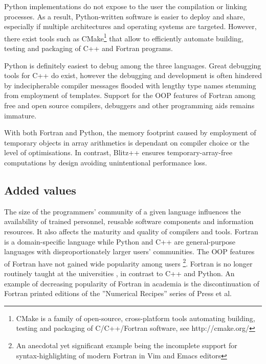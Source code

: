 \documentclass[final,5p,times,twocolumn]{elsarticle}
\newcommand{\url}[1]{{#1}}
\begin{document}
  Python implementations do not expose to the user the compilation or linking processes. 
  As a result, Python-written software is easier to deploy and share, especially 
    if multiple architectures and operating systems are targeted.
  However, there exist tools such as CMake\footnote{CMake is a family of open-source, cross-platform
    tools automating building, testing and packaging of C/C++/Fortran software,
    see \url{http://cmake.org/}}
    that allow to efficiently automate 
    building, testing and packaging of C++ and Fortran programs.

  Python is definitely easiest to debug among the three languages.
  Great debugging tools for C++ do exist, however the debugging and development is 
    often hindered by indecipherable compiler messages
    flooded with lengthy type names stemming from employment of templates.
  Support for the OOP features of Fortran among free and open source compilers, 
    debuggers and other programming aids remains immature.
    
  With both Fortran and Python, the memory footprint caused by employment
    of temporary objects in array arithmetics is dependant on compiler choice or
    the level of optimisations.
  In contrast, Blitz++ ensures temporary-array-free computations by design
    \citep{Veldhuizen_et_al_1997} avoiding unintentional performance loss.

  \subsection{Added values}

  The size of the programmers' community of a given language 
    influences the availability of trained personnel, 
    reusable software components and information resources.
  It also affects the maturity and quality of compilers and tools. 
  Fortran is a domain-specific language while Python and C++ are general-purpose languages
    with disproportionately larger users' communities.
  The OOP features of Fortran have not gained
    wide popularity among users \citep{Worth_2008}\footnote{An anecdotal yet significant
    example being the incomplete support for syntax-highlighting of modern Fortran in Vim and Emacs editors}.
  Fortran is no longer routinely taught at the universities \citep{Kendall_et_al_2008},
    in contrast to C++ and Python.
  An example of decreasing popularity of Fortran in academia 
    is the discontinuation of Fortran printed editions of the ''Numerical Recipes'' 
    series of Press et al.
 
\end{document}
